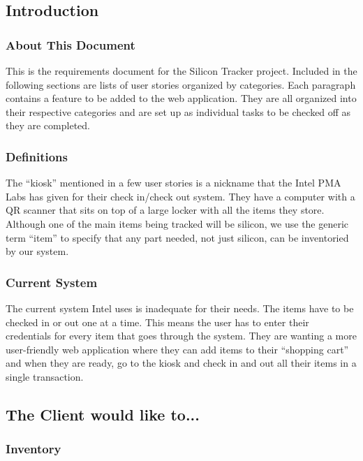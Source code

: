 \documentclass[10pt, onecolumn, twoside, peerreview]{IEEEtran}
\begin{document}
\subsection{Introduction}

\subsubsection{About This Document}
This is the requirements document for the Silicon Tracker project. Included in the following sections are lists of user
stories organized by categories. Each paragraph contains a feature to be added to the web application. They are all
organized into their respective categories and are set up as individual tasks to be checked off as they are
completed.\\

\subsubsection{Definitions}
The “kiosk” mentioned in a few user stories is a nickname that the Intel PMA Labs has given for their check in/check
out system. They have a computer with a QR scanner that sits on top of a large locker with all the items they store.\\

Although one of the main items being tracked will be silicon, we use the generic term “item” to specify that any part
needed, not just silicon, can be inventoried by our system.\\

\subsubsection{Current System}
The current system Intel uses is inadequate for their needs. The items have to be checked in or out one at a time. This
means the user has to enter their credentials for every item that goes through the system. They are wanting a more
user-friendly web application where they can add items to their “shopping cart” and when they are ready, go to the
kiosk and check in and out all their items in a single transaction.\\

\subsection{The Client would like to...}

\subsubsection{Inventory}
\end{document}
